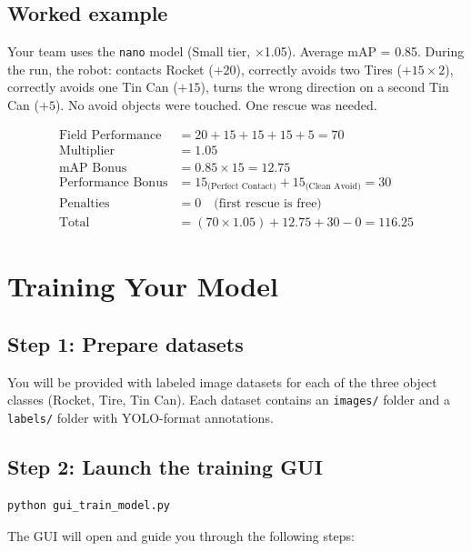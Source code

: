 \documentclass[a4]{article}
\begin{document}
\subsection*{Worked example}

Your team uses the \texttt{nano} model (Small tier, $\times$1.05). Average mAP = 0.85. During the run, the robot: contacts Rocket ($+20$), correctly avoids two Tires ($+15 \times 2$), correctly avoids one Tin Can ($+15$), turns the wrong direction on a second Tin Can ($+5$). No avoid objects were touched. One rescue was needed.

\begin{align*}
\text{Field Performance} &= 20 + 15 + 15 + 15 + 5 = 70 \\
\text{Multiplier} &= 1.05 \\
\text{mAP Bonus} &= 0.85 \times 15 = 12.75 \\
\text{Performance Bonus} &= 15_{\text{(Perfect Contact)}} + 15_{\text{(Clean Avoid)}} = 30 \\
\text{Penalties} &= 0 \quad \text{(first rescue is free)} \\
\text{Total} &= (70 \times 1.05) + 12.75 + 30 - 0 = \mathbf{116.25}
\end{align*}

\pagebreak
\section*{Training Your Model}

\subsection*{Step 1: Prepare datasets}

You will be provided with labeled image datasets for each of the three object classes (Rocket, Tire, Tin Can). Each dataset contains an \texttt{images/} folder and a \texttt{labels/} folder with YOLO-format annotations.

\subsection*{Step 2: Launch the training GUI}

\begin{verbatim}
python gui_train_model.py
\end{verbatim}

The GUI will open and guide you through the following steps:
\end{document}
